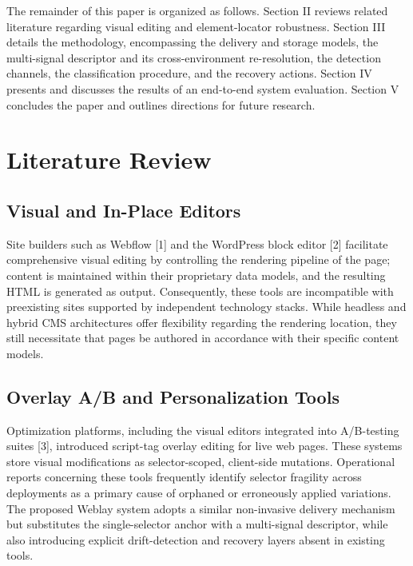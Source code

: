 \documentclass[conference]{IEEEtran}
\begin{document}
The remainder of this paper is organized as follows. Section II reviews related literature regarding visual editing and element-locator robustness. Section III details the methodology, encompassing the delivery and storage models, the multi-signal descriptor and its cross-environment re-resolution, the detection channels, the classification procedure, and the recovery actions. Section IV presents and discusses the results of an end-to-end system evaluation. Section V concludes the paper and outlines directions for future research.

\section{Literature Review}\label{sec:related}
\subsection{Visual and In-Place Editors}
Site builders such as Webflow [1] and the WordPress block editor [2] facilitate comprehensive visual editing by controlling the rendering pipeline of the page; content is maintained within their proprietary data models, and the resulting HTML is generated as output. Consequently, these tools are incompatible with preexisting sites supported by independent technology stacks. While headless and hybrid CMS architectures offer flexibility regarding the rendering location, they still necessitate that pages be authored in accordance with their specific content models.

\subsection{Overlay A/B and Personalization Tools}
Optimization platforms, including the visual editors integrated into A/B-testing suites [3], introduced script-tag overlay editing for live web pages. These systems store visual modifications as selector-scoped, client-side mutations. Operational reports concerning these tools frequently identify selector fragility across deployments as a primary cause of orphaned or erroneously applied variations. The proposed Weblay system adopts a similar non-invasive delivery mechanism but substitutes the single-selector anchor with a multi-signal descriptor, while also introducing explicit drift-detection and recovery layers absent in existing tools.
\end{document}
